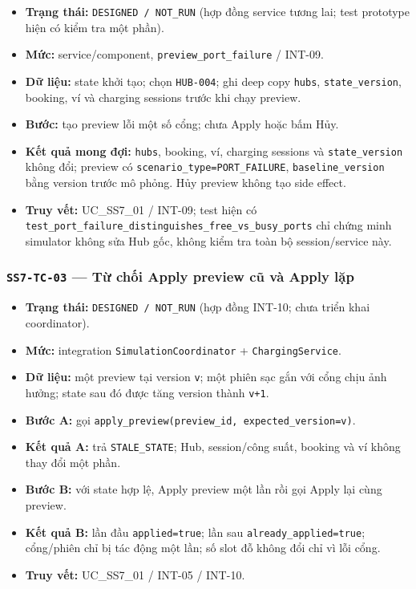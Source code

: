 \documentclass[11pt,a4paper]{article}
\providecommand{\tightlist}{%
  \setlength{\itemsep}{0pt}\setlength{\parskip}{0pt}}
\begin{document}
\begin{itemize}
\tightlist
\item
  \textbf{Trạng thái:} \texttt{DESIGNED\ /\ NOT\_RUN} (hợp đồng service
  tương lai; test prototype hiện có kiểm tra một phần).
\item
  \textbf{Mức:} service/component, \texttt{preview\_port\_failure} /
  INT-09.
\item
  \textbf{Dữ liệu:} state khởi tạo; chọn \texttt{HUB-004}; ghi deep copy
  \texttt{hubs}, \texttt{state\_version}, booking, ví và charging
  sessions trước khi chạy preview.
\item
  \textbf{Bước:} tạo preview lỗi một số cổng; chưa Apply hoặc bấm Hủy.
\item
  \textbf{Kết quả mong đợi:} \texttt{hubs}, booking, ví, charging
  sessions và \texttt{state\_version} không đổi; preview có
  \texttt{scenario\_type=PORT\_FAILURE}, \texttt{baseline\_version} bằng
  version trước mô phỏng. Hủy preview không tạo side effect.
\item
  \textbf{Truy vết:} UC\_SS7\_01 / INT-09; test hiện có
  \texttt{test\_port\_failure\_distinguishes\_free\_vs\_busy\_ports} chỉ
  chứng minh simulator không sửa Hub gốc, không kiểm tra toàn bộ
  session/service này.
\end{itemize}

\hypertarget{ss7-tc-03-tux1eeb-chux1ed1i-apply-preview-cux169-vuxe0-apply-lux1eb7p}{%
\subsubsection{\texorpdfstring{\texttt{SS7-TC-03} --- Từ chối Apply
preview cũ và Apply
lặp}{SS7-TC-03 --- Từ chối Apply preview cũ và Apply lặp}}\label{ss7-tc-03-tux1eeb-chux1ed1i-apply-preview-cux169-vuxe0-apply-lux1eb7p}}

\begin{itemize}
\tightlist
\item
  \textbf{Trạng thái:} \texttt{DESIGNED\ /\ NOT\_RUN} (hợp đồng INT-10;
  chưa triển khai coordinator).
\item
  \textbf{Mức:} integration \texttt{SimulationCoordinator} +
  \texttt{ChargingService}.
\item
  \textbf{Dữ liệu:} một preview tại version \texttt{v}; một phiên sạc
  gắn với cổng chịu ảnh hưởng; state sau đó được tăng version thành
  \texttt{v+1}.
\item
  \textbf{Bước A:} gọi
  \texttt{apply\_preview(preview\_id,\ expected\_version=v)}.
\item
  \textbf{Kết quả A:} trả \texttt{STALE\_STATE}; Hub, session/công suất,
  booking và ví không thay đổi một phần.
\item
  \textbf{Bước B:} với state hợp lệ, Apply preview một lần rồi gọi Apply
  lại cùng preview.
\item
  \textbf{Kết quả B:} lần đầu \texttt{applied=true}; lần sau
  \texttt{already\_applied=true}; cổng/phiên chỉ bị tác động một lần; số
  slot đỗ không đổi chỉ vì lỗi cổng.
\item
  \textbf{Truy vết:} UC\_SS7\_01 / INT-05 / INT-10.
\end{itemize}
\end{document}
